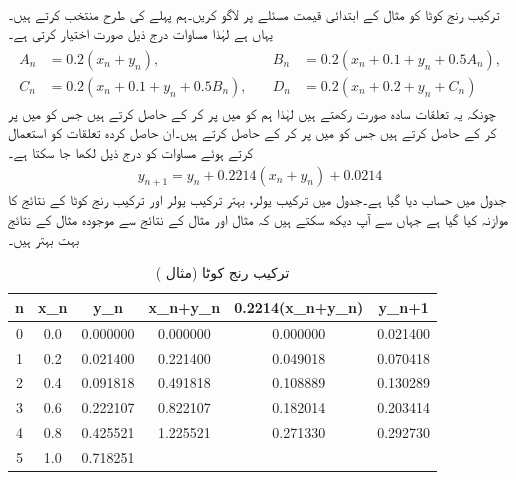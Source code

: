 \quad {}\\
ترکیب رنج کوٹا کو مثال  کے ابتدائی قیمت مسئلے پر لاگو کریں۔ہم پہلے کی طرح  منتخب کرتے ہیں۔یہاں  ہے لہٰذا مساوات  درج ذیل صورت اختیار کرتی ہے۔
\begin{gather}
\begin{aligned}
A_n&=0.2(x_n+y_n),\\
C_n&=0.2(x_n+0.1+y_n+0.5B_n),
\end{aligned}
\quad
\begin{aligned}
B_n&=0.2(x_n+0.1+y_n+0.5A_n),\\
D_n&=0.2(x_n+0.2+y_n+C_n)
\end{aligned}
\end{gather}
چونکہ یہ تعلقات سادہ صورت رکھتے ہیں لہٰذا ہم  کو  میں پر کر کے حاصل کرتے ہیں جس کو  میں پر کر کے  حاصل کرتے ہیں جس کو  میں پر کر کے  حاصل کرتے ہیں۔ان حاصل کردہ تعلقات کو استعمال کرتے ہوئے  مساوات  کو درج ذیل لکھا جا سکتا ہے۔
\begin{align*}
y_{n+1}=y_n+0.2214(x_n+y_n)+0.0214
\end{align*}
جدول میں حساب دیا گیا ہے۔جدول  میں ترکیب یولر، بہتر ترکیب یولر اور ترکیب رنج کوٹا کے نتائج کا موازنہ کیا گیا ہے جہاں سے آپ دیکھ سکتے ہیں کہ  مثال  اور مثال  کے نتائج سے موجودہ مثال کے نتائج بہت بہتر ہیں۔
\begin{table}
\caption{ترکیب رنج کوٹا (مثال )}
\label{جدول_مثال_اعدادی_رنج_کوٹا_الف}
\centering
\begin{tabular}{|C|C|C|C|C|C|}
\hline
n&x_n&y_n&x_n+y_n&0.2214(x_n+y_n)&y_{n+1}\\
&0.0&\num{0.000000}&\num{0.000000}&\num{0.000000}&\num{0.021400}\\
1&0.2&\num{0.021400}&\num{0.221400}&\num{0.049018}&\num{0.070418}\\
2&0.4&\num{0.091818}&\num{0.491818}&\num{0.108889}&\num{0.130289}\\
3&0.6&\num{0.222107}&\num{0.822107}&\num{0.182014}&\num{0.203414}\\
4&0.8&\num{0.425521}&\num{1.225521}&\num{0.271330}&\num{0.292730}\\
5&1.0&\num{0.718251}&&&\\
\hline
\end{tabular}

\end{table}
